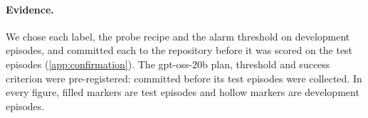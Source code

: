 \paragraph{Evidence.}
We chose each label, the probe recipe and the alarm threshold on development episodes, and committed each to the repository before it was scored on the test episodes (\cref{app:confirmation}).
The gpt-oss-20b plan, threshold and success criterion were pre-registered: committed before its test episodes were collected.
In every figure, filled markers are test episodes and hollow markers are development episodes.
